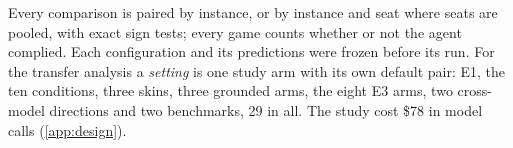 Every comparison is paired by instance, or by instance and seat where seats are pooled, with exact sign tests; every game counts whether or not the agent complied. Each configuration and its predictions were frozen before its run. For the transfer analysis a \emph{setting} is one study arm with its own default pair: E1, the ten conditions, three skins, three grounded arms, the eight E3 arms, two cross-model directions and two benchmarks, 29 in all. The study cost \$78 in model calls (\cref{app:design}).

